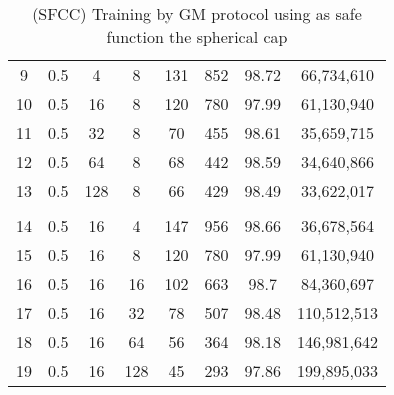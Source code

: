 \begin{table}[H]
\begin{tabular}{|c|c|c|c|c|c|c|c|}
        9                      & 0.5                   & 4                     & 8                     & 131                   & 852                   & 98.72                 & 66,734,610               \\
        10                     & 0.5                   & 16                    & 8                     & 120                   & 780                   & 97.99                 & 61,130,940               \\
        11                     & 0.5                   & 32                    & 8                     & 70                    & 455                   & 98.61                 & 35,659,715               \\
        12                     & 0.5                   & 64                    & 8                     & 68                    & 442                   & 98.59                 & 34,640,866               \\
        13                     & 0.5                   & 128                   & 8                     & 66                    & 429                   & 98.49                 & 33,622,017               \\
        \hline
        \multicolumn{1}{|l|}{} & \multicolumn{1}{l|}{} & \multicolumn{1}{l|}{} & \multicolumn{1}{l|}{} & \multicolumn{1}{l|}{} & \multicolumn{1}{l|}{} & \multicolumn{1}{l|}{} & \multicolumn{1}{l|}{}    \\
        \hline
        14                     & 0.5                   & 16                    & 4                     & 147                   & 956                   & 98.66                 & 36,678,564               \\
        15                     & 0.5                   & 16                    & 8                     & 120                   & 780                   & 97.99                 & 61,130,940               \\
        16                     & 0.5                   & 16                    & 16                    & 102                   & 663                   & 98.7                  & 84,360,697               \\
        17                     & 0.5                   & 16                    & 32                    & 78                    & 507                   & 98.48                 & 110,512,513              \\
        18                     & 0.5                   & 16                    & 64                    & 56                    & 364                   & 98.18                 & 146,981,642              \\
        19                     & 0.5                   & 16                    & 128                   & 45                    & 293                   & 97.86                 & 199,895,033              \\
        \hline
    \end{tabular}
    \caption{(SFCC) Training by GM protocol using as safe function the spherical cap}
    \label{tab:table-gm-sf2-class-exp}
\end{table}

